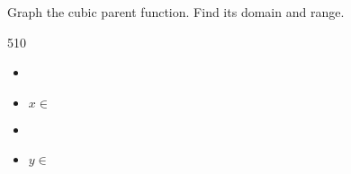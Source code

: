 {
    Graph the cubic parent function.
    Find its domain and range.\\
    \begin{minipage}{0.39\textwidth}
        \begin{myTikzpictureGrid}{0.25} {5}{10} 
        \end{myTikzpictureGrid}
    \end{minipage}
    \begin{minipage}{0.55\textwidth}
        \small
        \begin{itemize}[fullwidth,nosep]
            \item {}
            \item $x \in $ \gap{$(-\infty,\infty)$}
        \end{itemize}
        \vspace{1em}
        \begin{itemize}[fullwidth,nosep]
            \item {}
            \item $y \in $ \gap{$(-\infty,\infty)$}
        \end{itemize}
    \end{minipage}
}

